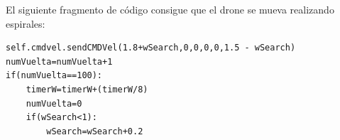 

El siguiente fragmento de c\'odigo consigue que el drone se mueva realizando espirales: \\

\begin{lstlisting}[backgroundcolor=\color{yellow}]
self.cmdvel.sendCMDVel(1.8+wSearch,0,0,0,0,1.5 - wSearch)
numVuelta=numVuelta+1
if(numVuelta==100):
    timerW=timerW+(timerW/8)
    numVuelta=0
    if(wSearch<1):
        wSearch=wSearch+0.2
\end{lstlisting}

